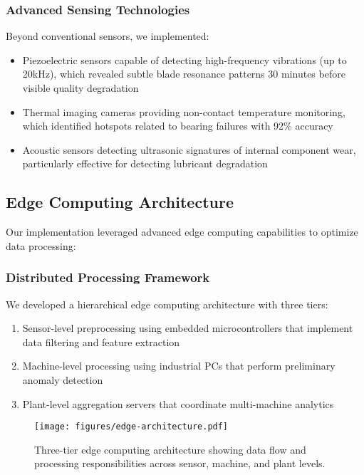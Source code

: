 \subsubsection{Advanced Sensing Technologies}
Beyond conventional sensors, we implemented:
\begin{itemize}
    \item Piezoelectric sensors capable of detecting high-frequency vibrations (up to 20kHz), which revealed subtle blade resonance patterns 30 minutes before visible quality degradation
    \item Thermal imaging cameras providing non-contact temperature monitoring, which identified hotspots related to bearing failures with 92\% accuracy
    \item Acoustic sensors detecting ultrasonic signatures of internal component wear, particularly effective for detecting lubricant degradation
\end{itemize}

\subsection{Edge Computing Architecture}
Our implementation leveraged advanced edge computing capabilities to optimize data processing:

\subsubsection{Distributed Processing Framework}
We developed a hierarchical edge computing architecture with three tiers:
\begin{enumerate}
    \item Sensor-level preprocessing using embedded microcontrollers that implement data filtering and feature extraction
    \item Machine-level processing using industrial PCs that perform preliminary anomaly detection
    \item Plant-level aggregation servers that coordinate multi-machine analytics
\end{enumerate}

\begin{figure}[t]
\centering
\texttt{[image: figures/edge-architecture.pdf]}
\caption{Three-tier edge computing architecture showing data flow and processing responsibilities across sensor, machine, and plant levels.}
\label{fig:edge_architecture}
\end{figure}

